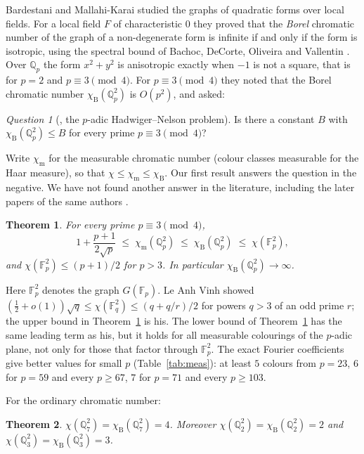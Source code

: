 \documentclass[11pt,a4paper]{amsart}
\newtheorem{theorem}{Theorem}
\theoremstyle{remark}
\newtheorem*{question}{Question}
\newcommand{\F}{\mathbb{F}}
\newcommand{\Q}{\mathbb{Q}}
\newcommand{\chiB}{\chi_{\mathrm{B}}}
\newcommand{\chiM}{\chi_{\mathrm{m}}}
\begin{document}
Bardestani and Mallahi-Karai \cite{BMK} studied the graphs of quadratic forms over local fields. For a local
field $F$ of characteristic $0$ they proved that the \emph{Borel} chromatic number of the graph of a
non-degenerate form is infinite if and only if the form is isotropic, using the spectral bound of
Bachoc, DeCorte, Oliveira and Vallentin \cite{BDOV}. Over $\Q_p$ the form $x^2+y^2$ is anisotropic exactly when
$-1$ is not a square, that is for $p=2$ and $p\equiv3\pmod4$. For $p\equiv3\pmod4$ they noted that the Borel
chromatic number $\chiB(\Q_p^2)$ is $O(p^2)$, and asked:

\begin{question}[{\cite[Question~1]{BMK}}, the $p$-adic Hadwiger--Nelson problem]
Is there a constant $B$ with $\chiB(\Q_p^2)\le B$ for every prime $p\equiv3\pmod4$?
\end{question}

Write $\chiM$ for the measurable chromatic number (colour classes measurable for the Haar measure), so that
$\chi\le\chiM\le\chiB$. Our first result answers the question in the negative. We have not found another answer
in the literature, including the later papers of the same authors \cite{BMK2,BMK3}.

\begin{theorem}\label{thm:A}
For every prime $p\equiv3\pmod4$,
\[
  1+\frac{p+1}{2\sqrt p}\;\le\;\chiM(\Q_p^2)\;\le\;\chiB(\Q_p^2)\;\le\;\chi(\F_p^2),
\]
and $\chi(\F_p^2)\le(p+1)/2$ for $p>3$. In particular $\chiB(\Q_p^2)\to\infty$.
\end{theorem}

Here $\F_p^2$ denotes the graph $G(\F_p)$. Le Anh Vinh \cite[Theorem~1]{Vinh} showed
$(\tfrac12+o(1))\sqrt q\le\chi(\F_q^2)\le(q+q/r)/2$ for powers $q>3$ of an odd prime $r$; the upper bound in
Theorem~\ref{thm:A} is his. The lower bound of Theorem~\ref{thm:A} has the same leading term as his, but it holds
for all measurable colourings of the $p$-adic plane, not only for those that factor through $\F_p^2$. The exact
Fourier coefficients give better values for small $p$ (Table~\ref{tab:meas}): at least $5$ colours from $p=23$,
$6$ for $p=59$ and every $p\ge67$, $7$ for $p=71$ and every $p\ge103$.

For the ordinary chromatic number:

\begin{theorem}\label{thm:B}
$\chi(\Q_7^2)=\chiB(\Q_7^2)=4$. Moreover $\chi(\Q_2^2)=\chiB(\Q_2^2)=2$ and $\chi(\Q_3^2)=\chiB(\Q_3^2)=3$.
\end{theorem}
\end{document}
